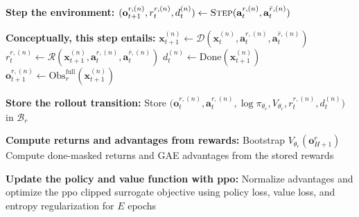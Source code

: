 \begin{algorithm}[H]
\begin{algorithmic}[1]
    \State \textbf{Step the environment:}
    \State \hspace{1em} $(\mathbf{o}_{t+1}^{r,(n)}, r_t^{r,(n)}, d_t^{(n)}) \leftarrow \textsc{Step}(\mathbf{a}_t^{r,(n)}, \mathbf{a}_t^{\bar r,(n)})$

    \State \textbf{Conceptually, this step entails:}
    \State \hspace{2em} $\mathbf{x}_{t+1}^{(n)} \leftarrow \mathcal{D}\!\left(\mathbf{x}_t^{(n)}, \mathbf{a}_t^{r,(n)}, \mathbf{a}_t^{\bar r,(n)}\right)$
    \State \hspace{2em} $r_t^{r,(n)} \leftarrow \mathcal{R}\!\left(\mathbf{x}_{t+1}^{(n)}, \mathbf{a}_t^{r,(n)}, \mathbf{a}_t^{\bar r,(n)}\right)$
    \State \hspace{2em} $d_t^{(n)} \leftarrow \mathrm{Done}\!\left(\mathbf{x}_{t+1}^{(n)}\right)$
    \State \hspace{2em} $\mathbf{o}_{t+1}^{r,(n)} \leftarrow \mathrm{Obs}^{\mathrm{full}}_r(\mathbf{x}_{t+1}^{(n)})$

    \State \textbf{Store the rollout transition:}
    \State \hspace{1em} Store $\big(\mathbf{o}_t^{r,(n)}, \mathbf{a}_t^{r,(n)}, \log \pi_{\theta_r}, V_{\theta_r}, r_t^{r,(n)}, d_t^{(n)}\big)$ in $\mathcal{B}_r$
  \EndFor

  \State \textbf{Compute returns and advantages from rewards:}
  \State \hspace{1em} Bootstrap $V_{\theta_r}(\mathbf{o}_{H+1}^r)$
  \State \hspace{1em} Compute done-masked returns and GAE advantages from the stored rewards

  \State \textbf{Update the policy and value function with \acs{ppo}:}
  \State \hspace{1em} Normalize advantages and optimize the \acs{ppo} clipped surrogate objective
  \State \hspace{1em} using policy loss, value loss, and entropy regularization for $E$ epochs
\EndFor
\end{algorithmic}
\end{algorithm}

